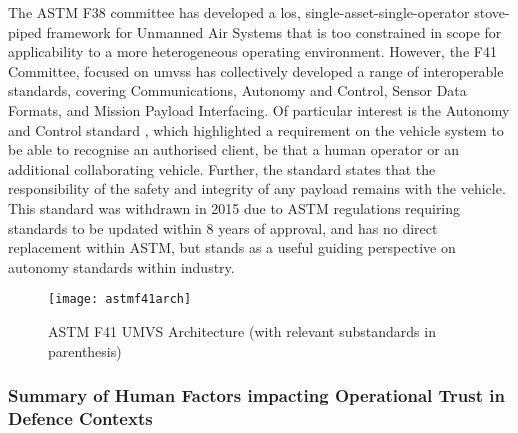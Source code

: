 The ASTM F38 committee has developed a \gls{los}, single-asset-single-operator stove-piped framework for Unmanned Air Systems that is too constrained in scope for applicability to a more heterogeneous operating environment\cite{AmericanSocietyofTestingandMaterials2007}.
However, the F41 Committee, focused on \glspl{umvs} has collectively developed a range of interoperable standards, covering Communications, Autonomy and Control, Sensor Data Formats, and Mission Payload Interfacing.
Of particular interest is the Autonomy and Control standard \cite{AmericanSocietyofTestingandMaterials2006}, which highlighted a requirement on the vehicle system to be able to recognise an authorised client, be that a human operator or an additional collaborating vehicle.
Further, the standard states that the responsibility of the safety and integrity of any payload remains with the vehicle.
This standard was withdrawn in 2015 due to ASTM regulations requiring standards to be updated within 8 years of approval, and has no direct replacement within ASTM, but stands as a useful guiding perspective on autonomy standards within industry.

\begin{figure}
  \texttt{[image: astmf41arch]}
  \caption{ASTM F41 UMVS Architecture  (with relevant substandards in parenthesis)}
  \label{fig:astmf41arch}
\end{figure}




\subsubsection{Summary of Human Factors impacting Operational Trust in Defence Contexts}

